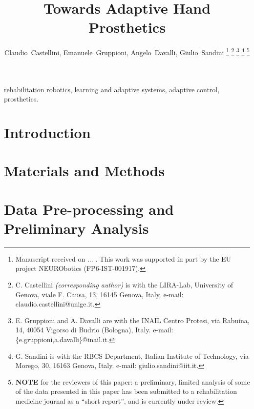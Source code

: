\documentclass[journal]{IEEEtran}
\begin{document}
\title{Towards Adaptive Hand Prosthetics}

\author{Claudio~Castellini, Emanuele~Gruppioni, Angelo~Davalli, Giulio~Sandini%
\thanks{Manuscript received on ... . This work was supported in part
  by the EU project NEURObotics (FP6-IST-001917).}%
\thanks{C. Castellini \emph{(corresponding author)}
  is with the LIRA-Lab, University of Genova,
  viale F. Causa, 13, 16145 Genova, Italy.
  e-mail: claudio.castellini@unige.it.}%
\thanks{E. Gruppioni and A. Davalli
  are with the INAIL Centro Protesi,
  via Rabuina, 14, 40054 Vigorso di Budrio (Bologna), Italy.
  e-mail: \{e.gruppioni,a.davalli\}@inail.it.}%
\thanks{G. Sandini
  is with the RBCS Department, Italian Institute of Technology,
  via Morego, 30, 16163 Genova, Italy.
  e-mail: giulio.sandini@iit.it.}%
\thanks{\textbf{NOTE} for the reviewers of this paper: a preliminary,
  limited analysis of some of the data presented in this paper has
  been submitted to a rehabilitation medicine journal as a ``short
  report'', and is currently under review.}%
}

\maketitle

\begin{abstract}
  
\end{abstract}

\begin{IEEEkeywords}
  rehabilitation robotics, learning and adaptive systems, adaptive
  control, prosthetics.
\end{IEEEkeywords}

\IEEEpeerreviewmaketitle

\section{Introduction}
\label{sec:intro}


\section{Materials and Methods}
\label{sec:m&ms}


\section{Data Pre-processing and Preliminary Analysis}
\label{sec:pre}

\end{document}
